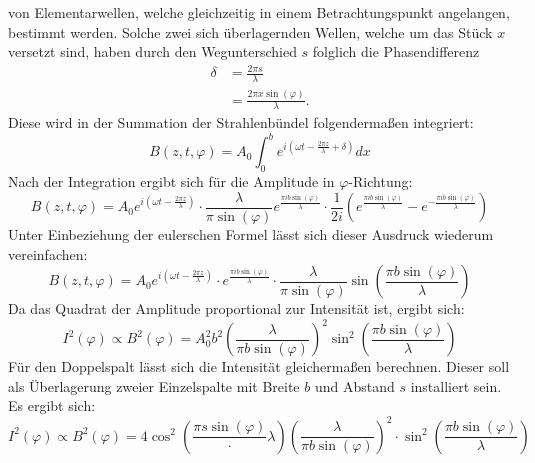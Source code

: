 von Elementarwellen, welche gleichzeitig in einem Betrachtungspunkt angelangen,
bestimmt werden. Solche zwei sich überlagernden Wellen, welche um das Stück $x$
versetzt sind, haben durch den Wegunterschied $s$ folglich die Phasendifferenz
\begin{align}
    \label{eqn:2}
    \delta &= \frac{2 \pi s}{\lambda} \\
    \label{eqn:3}
           &= \frac{2 \pi x \sin(\varphi)}{\lambda}.
\end{align}
\noindent Diese wird in der Summation der Strahlenbündel folgendermaßen integriert:
\begin{equation}
    \label{eqn:4}
    B(z,t,\varphi) = A_0 \int_0^b e^{i\left(\omega t - \frac{2 \pi z}{\lambda}
    + \delta\right)} dx
\end{equation}
\noindent Nach der Integration ergibt sich für die Amplitude in $\varphi$-Richtung:
\begin{equation}
    \label{eqn:5}
    B(z,t,\varphi) = A_0 e^{i\left(\omega t - \frac{2 \pi z}{\lambda}\right)}
    \cdot \frac{\lambda}{\pi \sin(\varphi)} e^{\frac{\pi i b \sin(\varphi)}{\lambda}}
    \cdot \frac{1}{2i} \left(e^{\frac{\pi i b \sin(\varphi)}{\lambda}}
    -e^{-\frac{\pi i b \sin(\varphi)}{\lambda}}\right)
\end{equation}
\noindent Unter Einbeziehung der eulerschen Formel lässt sich dieser Ausdruck
wiederum vereinfachen:
\begin{equation}
    \label{eqn:6}
    B(z,t,\varphi) = A_0 e^{i\left(\omega t - \frac{2 \pi z}{\lambda}\right)}
    \cdot e^{\frac{\pi i b \sin(\varphi)}{\lambda}} \cdot \frac{\lambda}{\pi \sin(\varphi)}
    \sin\left(\frac{\pi b \sin(\varphi)}{\lambda}\right)
\end{equation}
\noindent Da das Quadrat der Amplitude proportional zur Intensität ist, ergibt 
sich:
\begin{equation}
    \label{eqn:7}
    I^2 (\varphi) \propto B^2 (\varphi) = A_0^2 b^2 \left(\frac{\lambda}
    {\pi b \sin(\varphi)}\right)^2 \sin^2 \left(\frac{\pi b \sin(\varphi)}
    {\lambda}\right)
\end{equation}
Für den Doppelspalt lässt sich die Intensität gleichermaßen berechnen. Dieser 
soll als Überlagerung zweier Einzelspalte mit Breite $b$ und Abstand $s$ 
installiert sein. Es ergibt sich:
\begin{equation}
    \label{eqn:8}
    I^2 (\varphi) \propto B^2 (\varphi) = 4 \cos^2 \left(\frac{\pi s \sin(\varphi)}
    \cdot {\lambda}\right) \left(\frac{\lambda}{\pi b \sin(\varphi)}\right)^2
    \cdot \sin^2\left(\frac{\pi b \sin(\varphi)}{\lambda}\right)
\end{equation}

